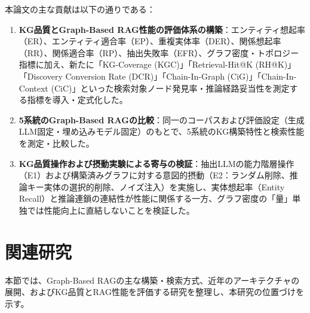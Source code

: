 \documentclass[a4j,dvipdfmx]{jsarticle}
\begin{document}
本論文の主な貢献は以下の通りである：
\begin{enumerate}
    \item \textbf{KG品質とGraph-Based RAG性能の評価体系の構築}：エンティティ想起率（ER）、エンティティ適合率（EP）、重複実体率（DER）、関係想起率（RR）、関係適合率（RP）、抽出失敗率（EFR）、グラフ密度・トポロジー指標に加え、新たに「KG-Coverage (KGC)」「Retrieval-Hit@K (RH@K)」「Discovery Conversion Rate (DCR)」「Chain-In-Graph (CiG)」「Chain-In-Context (CiC)」といった検索対象ノード発見率・推論経路妥当性を測定する指標を導入・定式化した。
    \item \textbf{5系統のGraph-Based RAGの比較}：同一のコーパスおよび評価設定（生成LLM固定・埋め込みモデル固定）のもとで、5系統のKG構築特性と検索性能を測定・比較した。
    \item \textbf{KG品質操作および摂動実験による寄与の検証}：抽出LLMの能力階層操作（E1）および構築済みグラフに対する意図的摂動（E2：ランダム削除、推論キー実体の選択的削除、ノイズ注入）を実施し、実体想起率（Entity Recall）と推論連鎖の連結性が性能に関係する一方、グラフ密度の「量」単独では性能向上に直結しないことを検証した。
\end{enumerate}


\section{関連研究}

本節では、Graph-Based RAGの主な構築・検索方式、近年のアーキテクチャの展開、およびKG品質とRAG性能を評価する研究を整理し、本研究の位置づけを示す。
\end{document}
